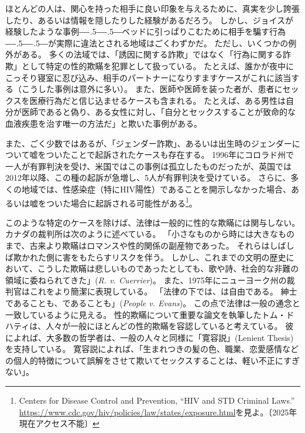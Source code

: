 \documentclass[paper=a4,book,openany]{jlreq}
\def\DDASH{―\kern-.5\zw―\kern-.5\zw―}
\begin{document}
ほとんどの人は、関心を持った相手に良い印象を与えるために、真実を少し誇張したり、あるいは情報を隠したりした経験があるだろう。
しかし、ジョイスが経験したような事例{\DDASH}ベッドに引っぱりこむために相手を騙す行為{\DDASH}が実際に違法とされる地域はごくわずかだ。
ただし、いくつかの例外がある。
多くの法域では、「誘因に関する詐欺」ではなく「行為に関する詐欺」として特定の性的欺瞞を犯罪として扱っている。
たとえば、誰かが夜中にこっそり寝室に忍び込み、相手のパートナーになりすますケースがこれに該当する（こうした事例は意外に多い）。
また、医師や医師を装った者が、患者にセックスを医療行為だと信じ込ませるケースも含まれる。
たとえば、ある男性は自分が医師であると偽り、ある女性に対し、「自分とセックスすることが致命的な血液疾患を治す唯一の方法だ」と欺いた事例がある\citep{chavez87:_woman_says_ruse_trick_her_sex}。

また、ごく少数ではあるが、「ジェンダー詐欺」、あるいは出生時のジェンダーについて嘘をついたことで起訴されたケースも存在する。
1996年にコロラド州で一人が有罪判決を受け、米国ではこの事例は孤立したものだったが、英国では2012年以降、この種の起訴が急増し、5人が有罪判決を受けている\citep{wilkinson17:_troub_case_uk_woman_convic_gender_fraud}。
さらに、多くの地域では、性感染症（特にHIV陽性）であることを開示しなかった場合、あるいは嘘をついた場合に起訴される可能性がある\footnote{Centers for Disease Control and Prevention, ``HIV and STD Criminal Laws.'' \url{https://www.cdc.gov/hiv/policies/law/states/exposure.html}を見よ。〔2025年現在アクセス不能〕}。

このような特定のケースを除けば、法律は一般的に性的な欺瞞には関与しない。
カナダの裁判所は次のように述べている。
「小さなものから時には大きなものまで、古来より欺瞞はロマンスや性的関係の副産物であった。
それらはしばしば欺かれた側に害をもたらすリスクを伴う。
しかし、これまでの文明の歴史において、こうした欺瞞は悲しいものであったとしても、歌や詩、社会的な非難の領域に委ねられてきた」(\emph{R. v. Cuerrier})。
また、1975年にニューヨーク州の裁判官はこれをより簡潔に表現している。
「法律の下では、は自由である。
紳士であることも、であることも」(\emph{People v. Evans})。
この点で法律は一般の通念と一致しているように見える。
性的欺瞞について重要な論文を執筆したトム・ドハティは、人々が一般にほとんどの性的欺瞞を容認していると考えている。
彼によれば、大多数の哲学者は、一般の人々と同様に「寛容説」(Lenient Thesis)を支持している。
寛容説によれば、「生まれつきの髪の色、職業、恋愛感情などの個人的特徴について誤解をさせて欺いてセックスすることは、軽い不正にすぎない」\citep[p.718]{dougherty13:_sex_lies_consen}。
\end{document}
